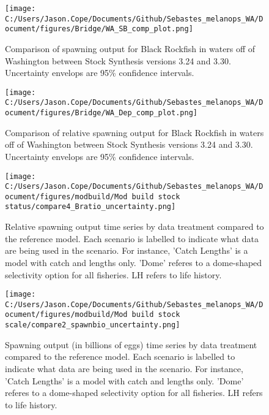 \documentclass[11pt,
  letterpaper,
]{article}
\begin{document}
\begin{figure}
{\centering
\texttt{[image: C:/Users/Jason.Cope/Documents/Github/Sebastes\_melanops\_WA/Document/figures/Bridge/WA\_SB\_comp\_plot.png]}
}
\caption{Comparison of spawning output for Black Rockfish in waters off of Washington between Stock Synthesis versions 3.24 and 3.30. Uncertainty envelops are 95\% confidence intervals.\label{fig:ssb_bridge_comps}}
\end{figure}

\pagebreak

\begin{figure}
{\centering
\texttt{[image: C:/Users/Jason.Cope/Documents/Github/Sebastes\_melanops\_WA/Document/figures/Bridge/WA\_Dep\_comp\_plot.png]}
}
\caption{Comparison of relative spawning output for Black Rockfish in waters off of Washington between Stock Synthesis versions 3.24 and 3.30. Uncertainty envelops are 95\% confidence intervals.\label{fig:deps_bridge_comps}}
\end{figure}

\pagebreak

\begin{figure}
{\centering
\texttt{[image: C:/Users/Jason.Cope/Documents/Github/Sebastes\_melanops\_WA/Document/figures/modbuild/Mod build stock status/compare4\_Bratio\_uncertainty.png]}
}
\caption{Relative spawning output time series by data treatment compared to the reference model. Each scenario is labelled to indicate what data are being used in the scenario. For instance, 'Catch Lengths' is a model with catch and lengths only. 'Dome' referes to a dome-shaped selectivity option for all fisheries. LH refers to life history.\label{fig:modbuild-data-depl}}
\end{figure}

\begin{figure}
{\centering
\texttt{[image: C:/Users/Jason.Cope/Documents/Github/Sebastes\_melanops\_WA/Document/figures/modbuild/Mod build stock scale/compare2\_spawnbio\_uncertainty.png]}
}
\caption{Spawning output (in billions of eggs) time series by data treatment compared to the reference model. Each scenario is labelled to indicate what data are being used in the scenario. For instance, 'Catch Lengths' is a model with catch and lengths only. 'Dome' referes to a dome-shaped selectivity option for all fisheries. LH refers to life history.\label{fig:modbuild-data-ssb}}
\end{figure}
\end{document}

